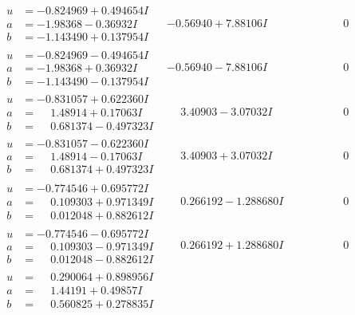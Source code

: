 \documentclass[1p]{elsarticle_modified}
\theoremstyle{definition}
\begin{document}
$$\begin{array}{c|c|c}
\begin{aligned}
u &= -0.824969 + 0.494654 I \\
a &= -1.98368 - 0.36932 I \\
b &= -1.143490 + 0.137954 I\end{aligned}
 & -0.56940 + 7.88106 I & \phantom{-0.000000 } 0 \\ \hline\begin{aligned}
u &= -0.824969 - 0.494654 I \\
a &= -1.98368 + 0.36932 I \\
b &= -1.143490 - 0.137954 I\end{aligned}
 & -0.56940 - 7.88106 I & \phantom{-0.000000 } 0 \\ \hline\begin{aligned}
u &= -0.831057 + 0.622360 I \\
a &= \phantom{-}1.48914 + 0.17063 I \\
b &= \phantom{-}0.681374 - 0.497323 I\end{aligned}
 & \phantom{-}3.40903 - 3.07032 I & \phantom{-0.000000 } 0 \\ \hline\begin{aligned}
u &= -0.831057 - 0.622360 I \\
a &= \phantom{-}1.48914 - 0.17063 I \\
b &= \phantom{-}0.681374 + 0.497323 I\end{aligned}
 & \phantom{-}3.40903 + 3.07032 I & \phantom{-0.000000 } 0 \\ \hline\begin{aligned}
u &= -0.774546 + 0.695772 I \\
a &= \phantom{-}0.109303 + 0.971349 I \\
b &= \phantom{-}0.012048 + 0.882612 I\end{aligned}
 & \phantom{-}0.266192 - 1.288680 I & \phantom{-0.000000 } 0 \\ \hline\begin{aligned}
u &= -0.774546 - 0.695772 I \\
a &= \phantom{-}0.109303 - 0.971349 I \\
b &= \phantom{-}0.012048 - 0.882612 I\end{aligned}
 & \phantom{-}0.266192 + 1.288680 I & \phantom{-0.000000 } 0 \\ \hline\begin{aligned}
u &= \phantom{-}0.290064 + 0.898956 I \\
a &= \phantom{-}1.44191 + 0.49857 I \\
b &= \phantom{-}0.560825 + 0.278835 I\end{aligned}

\end{array}$$
\end{document}
